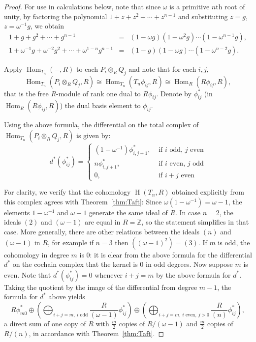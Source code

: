 \documentclass[11pt]{amsart}
\numberwithin{equation}{section}
\theoremstyle{definition}
\theoremstyle{remark}
\newcommand{\Z}{\mathbb{Z}}
\newcommand{\om}{\omega}
\newcommand\Homol{\operatorname{H}}
\newcommand\coh{\Homol}
\newcommand\ot{\otimes}
\newcommand\Hom{\operatorname{Hom}}
\begin{document}
\begin{proof}
\quad

For use in calculations below, note that since $\om$ is a primitive $n$th 
root of unity, by factoring the polynomial 
$1+z+z^2 + \cdots + z^{n-1}$ and substituting $z=g$, $z=\om^{-1} g$, we obtain
\begin{eqnarray*}
   1 + g + g^2 + \cdots + g^{n-1} &=& (1-\om g) (1 - \om^2 g) \cdots (1 - \om^{n-1}g), \\
   1 + \om^{-1}g + \om^{-2}g^2 + \cdots + \om^{1-n}g^{n-1} &=& (1-g)(1-\om g)\cdots
     (1 - \om^{n-2}g) .
\end{eqnarray*}


Apply $\Hom_{T_n}( - , R)$ to each $P_i\ot_R Q_j$
and note that for each $i,j$, 
\[
  \Hom_{T_n}(P_i\ot_R Q_j , R)\cong
  \Hom_{T_n}(T_n \phi_{ij}, R)\cong \Hom_R (R\phi_{ij},R) ,
  \]
that is the free $R$-module of rank one dual to $R\phi_{ij}$. 
Denote by $\phi_{ij}^*$ (in $\Hom_R (R\phi_{ij},R)$) 
the dual basis element to $\phi_{ij}$. 


Using the above formula,
the differential on the total complex of
$\Hom_{T_n}(P_i\ot_R Q_j , R)$ is given by:
\[
  d^*(\phi^*_{ij}) = \left\{\begin{array}{ll}
    (1-\om^{-1})\phi^*_{i,j+1} , & \mbox{ if $i$ odd, $j$ even}\\
   n \phi_{i,j+1}^*, & \mbox{ if $i$ even, $j$ odd}\\
   0 , & \mbox{ if $i+j$  even}
  \end{array}\right.
\]

\quad

For clarity, we verify that the cohomology $\coh(T_n,R)$ 
obtained explicitly from this complex agrees with
Theorem~\ref{thm:Taft}:
Since $\omega (1-\omega^{-1})= \omega -1$,
the elements $1-\omega^{-1}$ and $\omega -1$
generate the same ideal of $R$. 
In case $n=2$,
the ideals $(2)$ and $(\omega -1)$ are equal in $R = \Z$,
so the statement simplifies in that case.
More generally, there are other relations between the ideals
$(n)$ and $(\omega -1)$ in $R$, for example if $n=3$ then $((\omega-1)^2)=(3)$. 
If $m$ is odd, the cohomology in degree $m$ is 0:
it is clear
 from the above formula for the differential $d^*$ on the cochain complex
  that the kernel is 0 in odd degrees.
  Now suppose $m$ is even. Note that $d^*(\phi^*_{ij}) = 0$ whenever $i+j=m$
  by the above formula for $d^*$.
  Taking the quotient by the image of the differential from degree $m-1$,
  the formula for $d^*$ above yields
  \begin{equation}\label{eqn:coh-revisited}
  R\phi^*_{m0}  \oplus
  \left(\bigoplus_{i+j=m, \ i \mbox{ odd}} \frac{R}{(\omega -1)}\phi^*_{ij} \right)
  \oplus \left(\bigoplus_{i+j=m, \ i \mbox{ even}, \ j>0}
          \frac{R}{(n)}\phi^*_{ij}\right) ,
  \end{equation}
          a direct sum of one copy of $R$ with $\frac{m}{2}$ copies
          of $R/(\omega-1)$ and $\frac{m}{2}$ copies of $R/(n)$,
in accordance with Theorem~\ref{thm:Taft}.



\end{proof}
\end{document}
